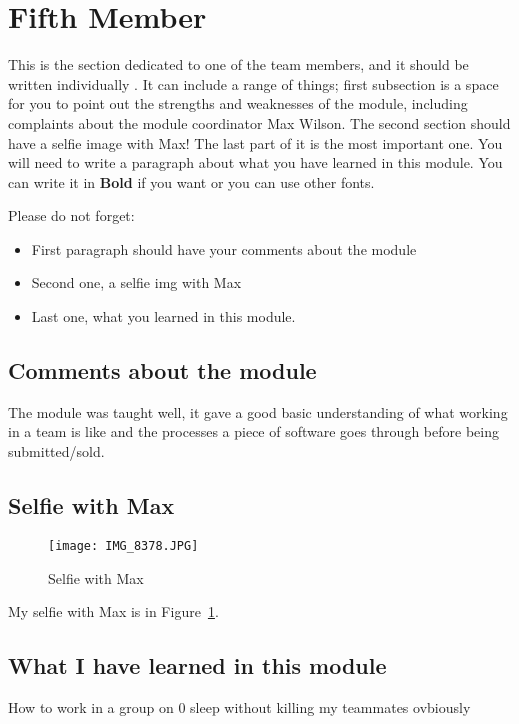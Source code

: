 \section{Fifth Member}
This is the section dedicated to one of the team members, and it should be written individually . It can include a range of things; first subsection is a space for you to point out the strengths and weaknesses of the module, including complaints about the module coordinator Max Wilson. The second section should have a selfie image with Max! The last part of it is the most important one. You will need to write a paragraph about what you have learned in this module. You can write it in \textbf{Bold} if you want or you can use other fonts. 

Please do not forget:
\begin{itemize}
	\item First paragraph should have your comments about the module
	\item Second one, a selfie img with Max
	\item Last one, what you learned in this module.
\end{itemize}

\subsection{Comments about the module}
The module was taught well, it gave a good basic understanding of what working in a team is like and the processes a piece of software goes through before being submitted/sold.

\subsection{Selfie with Max}

 

\begin{figure}[h]
\caption{Selfie with Max}
\centering
\texttt{[image: IMG\_8378.JPG]}
\label{fig:selfie}
\end{figure}

 My selfie with Max is in  Figure~\ref{fig:selfie}.

\subsection{What I have learned in this module}
How to work in a group on 0 sleep without killing my teammates ovbiously
